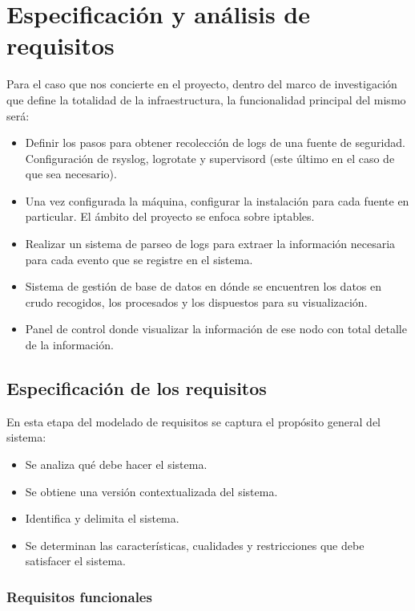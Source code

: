 \chapter[Requisitos]{Especificación y análisis de requisitos}
\label{chap:requisitos}

Para el caso que nos concierte en el proyecto, dentro del marco de investigación que define la totalidad de la infraestructura, la funcionalidad principal del mismo será:

\begin{itemize}
\item Definir los pasos para obtener recolección de logs de una fuente de seguridad. Configuración de rsyslog, logrotate y supervisord (este último en el caso de que sea necesario).
\item Una vez configurada la máquina, configurar la instalación para cada fuente en particular. El ámbito del proyecto se enfoca sobre iptables.
\item Realizar un sistema de parseo de logs para extraer la información necesaria para cada evento que se registre en el sistema.
\item Sistema de gestión de base de datos en dónde se encuentren los datos en crudo recogidos, los procesados y los dispuestos para su visualización.
\item Panel de control donde visualizar la información de ese nodo con total detalle de la información.
\end{itemize}

\section[Especificación]{Especificación de los requisitos}

En esta etapa del modelado de requisitos se captura el propósito general del sistema:

\begin{itemize}
\item Se analiza qué debe hacer el sistema.
\item Se obtiene una versión contextualizada del sistema.
\item Identifica y delimita el sistema.
\item Se determinan las características, cualidades y restricciones que debe satisfacer el sistema.
\end{itemize}

\subsection{Requisitos funcionales}


